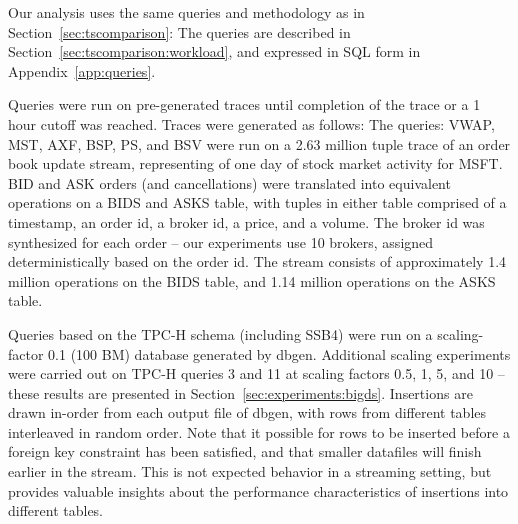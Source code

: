 Our analysis uses the same queries and methodology as in Section~\ref{sec:tscomparison}: The queries are described in Section~\ref{sec:tscomparison:workload}, and expressed in SQL form in Appendix~\ref{app:queries}.



Queries were run on pre-generated traces until completion of the trace or a 1 hour cutoff was reached.  Traces were generated as follows: The queries: VWAP, MST, AXF, BSP, PS, and BSV were run on a 2.63 million tuple trace of an order book update stream, representing of one day of stock market activity for MSFT.  BID and ASK orders (and cancellations) were translated into equivalent operations on a BIDS and ASKS table, with tuples in either table comprised of a timestamp, an order id, a broker id, a price, and a volume.  The broker id was synthesized for each order -- our experiments use 10 brokers, assigned deterministically based on the order id.  The stream consists of approximately 1.4 million operations on the BIDS table, and 1.14 million operations on the ASKS table.

Queries based on the TPC-H schema (including SSB4) were run on a scaling-factor 0.1 (100 BM) database generated by dbgen\cite{tpch}.  Additional scaling experiments were carried out on TPC-H queries 3 and 11 at scaling factors 0.5, 1, 5, and 10 -- these results are presented in Section~\ref{sec:experiments:bigds}.  Insertions are drawn in-order from each output file of dbgen, with rows from different tables interleaved in random order.  Note that it possible for rows to be inserted before a foreign key constraint has been satisfied, and that smaller datafiles will finish earlier in the stream.  This is not expected behavior in a streaming setting, but provides valuable insights about the performance characteristics of insertions into different tables.

